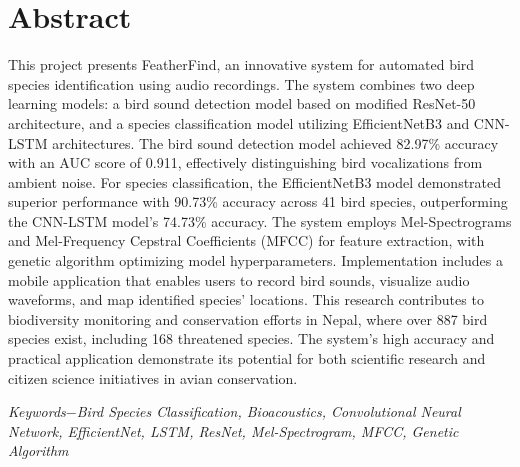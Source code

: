 \chapter*{Abstract}
This project presents FeatherFind, an innovative system for automated bird species identification using audio recordings. The system combines two deep learning models: a bird sound detection model based on modified ResNet-50 architecture, and a species classification model utilizing EfficientNetB3 and CNN-LSTM architectures. The bird sound detection model achieved 82.97\% accuracy with an AUC score of 0.911, effectively distinguishing bird vocalizations from ambient noise. For species classification, the EfficientNetB3 model demonstrated superior performance with 90.73\% accuracy across 41 bird species, outperforming the CNN-LSTM model's 74.73\% accuracy. The system employs Mel-Spectrograms and Mel-Frequency Cepstral Coefficients (MFCC) for feature extraction, with genetic algorithm optimizing model hyperparameters. Implementation includes a mobile application that enables users to record bird sounds, visualize audio waveforms, and map identified species' locations. This research contributes to biodiversity monitoring and conservation efforts in Nepal, where over 887 bird species exist, including 168 threatened species. The system's high accuracy and practical application demonstrate its potential for both scientific research and citizen science initiatives in avian conservation.

{\textit{Keywords$-$Bird Species Classification, Bioacoustics, Convolutional Neural Network, EfficientNet, LSTM, ResNet, Mel-Spectrogram, MFCC, Genetic Algorithm}}




